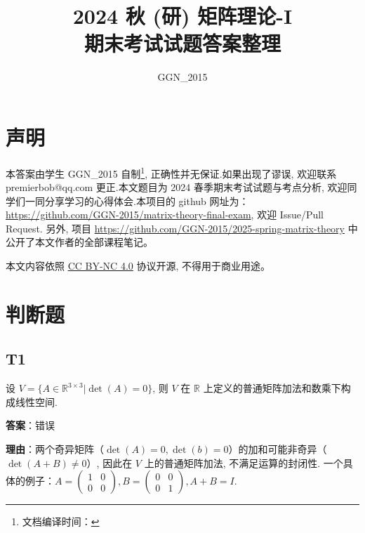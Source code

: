 \documentclass{article}
\title{2024 秋 (研) 矩阵理论-I\\期末考试试题答案整理}
\author{GGN\_2015}
\date{}
\newcommand{\getcompiletimestamp}{
	文档编译时间：\DTMnow
}
\begin{document}
\maketitle

\section{声明}

\par 本答案由学生 GGN\_2015 自制\footnote{\getcompiletimestamp}, 正确性并无保证.如果出现了谬误, 欢迎联系 premierbob@qq.com 更正.本文题目为 2024 春季期末考试试题与考点分析, 欢迎同学们一同分享学习的心得体会.本项目的 github 网址为：\href{https://github.com/GGN-2015/matrix-theory-final-exam}{https://github.com/GGN-2015/matrix-theory-final-exam}, 欢迎 Issue/Pull Request. 另外, 项目 \href{https://github.com/GGN-2015/2025-spring-matrix-theory}{https://github.com/GGN-2015/2025-spring-matrix-theory} 中公开了本文作者的全部课程笔记。

\par 本文内容依照 \href{https://creativecommons.org/licenses/by-nc/4.0/deed.zh-hans}{CC BY-NC 4.0} 协议开源, 不得用于商业用途。



\newpage

\tableofcontents

\newpage

\section{判断题}

\subsection{T1}

\par 设 \(V=\{A\in \mathbb R^{3\times 3}| \det(A) = 0\}\), 则 $V$ 在 $\mathbb R$ 上定义的普通矩阵加法和数乘下构成线性空间.

\par \textbf{答案}：错误

\par \textbf{理由}：两个奇异矩阵（$\det(A)=0, \det(b)=0$）的加和可能非奇异（$\det(A+B)\neq 0$）, 因此在 $V$ 上的普通矩阵加法, 不满足运算的封闭性. 一个具体的例子：$A=\begin{pmatrix}
	1 & 0\\
	0 & 0
\end{pmatrix}, B = \begin{pmatrix}
	0 & 0\\
	0 & 1
\end{pmatrix}, A+B=I$.
\end{document}
